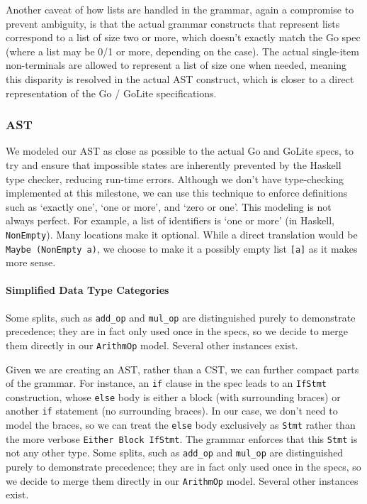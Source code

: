 \documentclass[11pt]{article}
\begin{document}
Another caveat of how lists are handled in the grammar, again a
compromise to prevent ambiguity, is that the actual grammar constructs
that represent lists correspond to a list of size two or more, which
doesn't exactly match the Go spec (where a list may be 0/1 or more,
depending on the case). The actual single-item non-terminals are
allowed to represent a list of size one when needed, meaning this
disparity is resolved in the actual AST construct, which is closer to
a direct representation of the Go / GoLite specifications.
\subsubsection{AST}
We modeled our AST as close as possible to the actual Go and GoLite
specs, to try and ensure that impossible states are inherently
prevented by the Haskell type checker, reducing run-time errors.
Although we don't have type-checking implemented at this milestone, we
can use this technique to enforce definitions such as `exactly one',
`one or more', and `zero or one'. This modeling is not always
perfect. For example, a
list of
identifiers\cite{gospec:idlist} is `one or more' (in Haskell, \texttt{NonEmpty}). Many
locations make it optional. While a direct translation would be
\texttt{Maybe (NonEmpty a)}, we choose to make it a possibly empty
list \texttt{[a]} as it makes more sense.
\paragraph{Simplified Data Type Categories}
Some splits, such as \texttt{add\_op} and \texttt{mul\_op} are
distinguished purely to demonstrate precedence; they are in fact only
used once in the specs, so we decide to merge them directly in our
\texttt{ArithmOp} model. Several other instances exist.

Given we are creating an AST, rather than a CST, we can further
compact parts of the grammar. For instance, an \texttt{if} clause in
the spec leads to an \texttt{IfStmt} construction, whose \texttt{else}
body is either a block (with surrounding braces) or another
\texttt{if} statement (no surrounding braces). In our case, we don't
need to model the braces, so we can treat the \texttt{else} body
exclusively as \texttt{Stmt} rather than the more verbose
\texttt{Either Block IfStmt}. The grammar enforces that this
\texttt{Stmt} is not any other type.  Some splits, such as
\texttt{add\_op} and \texttt{mul\_op} are distinguished purely to
demonstrate precedence; they are in fact only used once in the specs,
so we decide to merge them directly in our \texttt{ArithmOp}
model. Several other instances exist.
\end{document}
